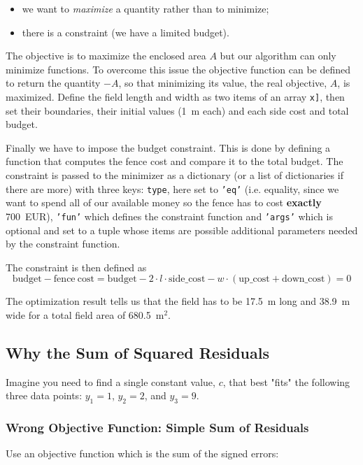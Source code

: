 \begin{itemize}
\tightlist
\item we want to \emph{maximize} a quantity rather than to minimize;
\item there is a constraint (we have a limited budget).
\end{itemize}


The objective is to maximize the enclosed area $A$ but our algorithm can only minimize functions. To overcome this issue the objective function can be defined to return the quantity $-A$, so that minimizing its value, the real objective, $A$, is maximized. 
Define the field length and width as two items of an array \texttt{x]}, then set their boundaries, their initial values (1~m each) and each side cost and total budget.

Finally we have to impose the budget constraint. This is done by defining a function that computes the fence cost and compare it to the total budget. The constraint is passed to the minimizer as a dictionary (or a list  of dictionaries if there are more) with three keys: \texttt{type}, here set to \texttt{'eq'} (i.e. equality, since we want to spend all of our available money so the fence has to cost \textbf{exactly} 700~EUR), \texttt{'fun'} 
which defines the constraint function and \texttt{'args'} which is optional and set to a tuple whose items are possible additional parameters needed by the constraint function.

The constraint is then defined as
\begin{equation*}
\mathrm{budget} - \mathrm{fence~cost} = \mathrm{budget} - 2\cdot l\cdot\mathrm{side\_cost} - w\cdot(\mathrm{up\_cost} + \mathrm{down\_cost}) = 0
\end{equation*}

The optimization result tells us that the field has to be 17.5~m long and 38.9~m wide for a total field area of 680.5~$\textrm{m}^2$.

\subsection{Why the Sum of Squared Residuals}
	
Imagine you need to find a single constant value, $c$, that best "fits" the following three data points: $y_1=1$, $y_2=2$, and $y_3=9$.

\subsubsection{Wrong Objective Function: Simple Sum of Residuals}
Use an objective function which is the sum of the signed errors:

